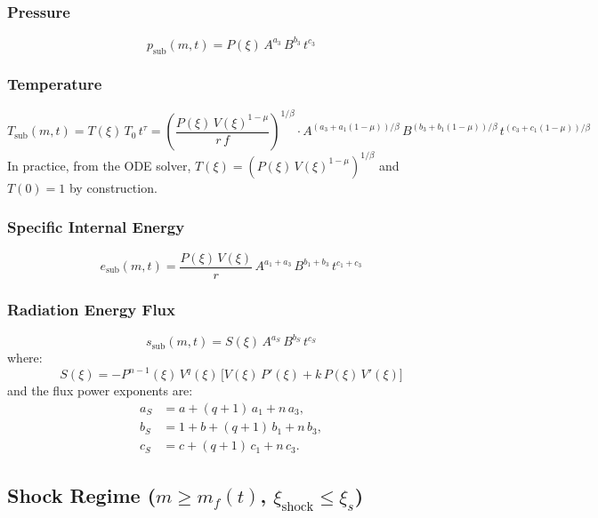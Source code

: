 \documentclass[11pt]{article}
\newcommand{\xsi}{\xi}
\newcommand{\xsis}{\xi_s}
\begin{document}
\subsubsection{Pressure}
\begin{equation}
  \boxed{p_{\mathrm{sub}}(m,t) = P(\xsi)\,A^{a_3}\,B^{b_3}\,t^{c_3}}
\end{equation}

\subsubsection{Temperature}
\begin{equation}
  \boxed{T_{\mathrm{sub}}(m,t) = T(\xsi)\,T_0\,t^{\tau}
  = \left(\frac{P(\xsi)\,V(\xsi)^{1-\mu}}{r\,f}\right)^{1/\beta}\!\cdot A^{(a_3+a_1(1-\mu))/\beta}\,B^{(b_3+b_1(1-\mu))/\beta}\,t^{(c_3+c_1(1-\mu))/\beta}}
\end{equation}
In practice, from the ODE solver, $T(\xsi) = (P(\xsi)\,V(\xsi)^{1-\mu})^{1/\beta}$ and $T(0) = 1$ by construction.

\subsubsection{Specific Internal Energy}
\begin{equation}
  \boxed{e_{\mathrm{sub}}(m,t) = \frac{P(\xsi)\,V(\xsi)}{r}\,A^{a_1+a_3}\,B^{b_1+b_3}\,t^{c_1+c_3}}
\end{equation}

\subsubsection{Radiation Energy Flux}
\begin{equation}
  \boxed{s_{\mathrm{sub}}(m,t) = S(\xsi)\,A^{a_S}\,B^{b_S}\,t^{c_S}}
\end{equation}
where:
\begin{equation}
  S(\xsi) = -P^{n-1}(\xsi)\,V^{q}(\xsi)\,
  \bigl[V(\xsi)\,P'(\xsi) + k\,P(\xsi)\,V'(\xsi)\bigr]
\end{equation}
and the flux power exponents are:
\begin{align}
  a_S &= a + (q+1)\,a_1 + n\,a_3, \\
  b_S &= 1 + b + (q+1)\,b_1 + n\,b_3, \\
  c_S &= c + (q+1)\,c_1 + n\,c_3.
\end{align}

\bigskip
\subsection{Shock Regime ($m \geq m_f(t)$, \;$\xsi_{\mathrm{shock}} \leq \xsis$)}
\end{document}

